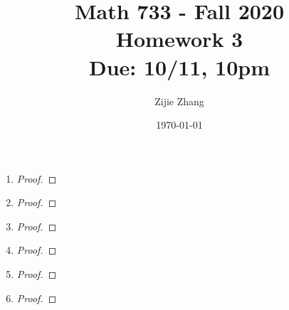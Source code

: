 \documentclass{article}
\title{Math 733 - Fall 2020\\
        {\Large \textbf{Homework 3}}\\
        {\normalsize \textbf{Due: 10/11, 10pm}}
    }
\author{Zijie Zhang}
\date{\today}
\begin{document}
    \maketitle
    \begin{enumerate}
        \item \begin{proof}
            
        \end{proof}


        \item \begin{proof}
            
        \end{proof}


        \item \begin{proof}
            
        \end{proof}

        

        \item \begin{proof}
            
        \end{proof}


        \item \begin{proof}

        \end{proof}


        \item \begin{proof}
            
        \end{proof}
    
    \end{enumerate}
\end{document}

